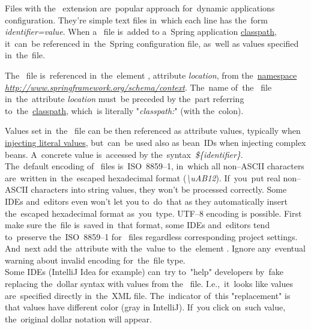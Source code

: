 Files with the~ extension are~popular approach for~dynamic applications configuration. They're simple text files in~which each line has the~form \textit{identifier=value}. When a~ file is~added to a~Spring application \hyperref[classpath]{classpath}, it~can~be referenced in~the~Spring configuration file, as~well as values specified in~the~file.

The~ file is~referenced in~the~element , attribute \textit{location}, from the~\hyperref[namespaces]{namespace} \textit{\href{http://www.springframework.org/schema/context}{http://www.springframework.org/schema/context}}. The~name of~the~ file in~the~attribute \textit{location} must~be preceded by the~part referring to~the~\hyperref[classpath]{classpath}, which~is literally "\textit{classpath:}" (with the~colon).

Values set in~the~ file can be then referenced as attribute values, typically when \hyperref[injectingliteralvalues]{injecting literal values}, but~can~be used also as bean~IDs when injecting complex beans. A~concrete value is~accessed by the~syntax~\textit{\$\{identifier\}}.\\

\warning The~default encoding of~ files is~\mbox{ISO~8859--1}, in~which all non--ASCII characters are~written in~the~escaped hexadecimal format (\textit{\textbackslash uAB12}). If~you~put real non--ASCII characters into string values, they won't be processed correctly. Some IDEs and~editors even won't let you to~do~that as they automatically insert the~escaped hexadecimal format as~you~type. UTF--8 encoding is possible. First make sure the~file is~saved in~that format, some IDEs and~editors tend to~preserve the~\mbox{ISO~8859--1} for~ files regardless corresponding project settings. And~next add the~attribute  with the~value  to~the~element . Ignore any~eventual warning about invalid encoding for~the~file type.\\

\warning Some IDEs (IntelliJ Idea for example) can~try to~"help" developers by~fake replacing the~dollar syntax with values from the~ file. I.e.,~it~looks like values are~specified directly in~the~XML file. The~indicator of~this "replacement" is that values have different color (gray in IntelliJ). If~you click on~such value, the~original dollar notation will appear.
\newpage

